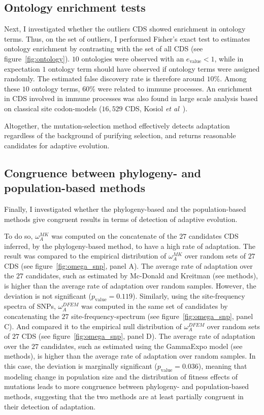 \documentclass{article}
\begin{document}
\subsection*{Ontology enrichment tests}
Next, I investigated whether the outliers CDS showed enrichment in ontology terms.
Thus, on the set of outliers, I performed Fisher's exact test to estimates ontology enrichment by contrasting with the set of all CDS (see figure~\ref{fig:ontology}).
$10$ ontologies were observed with an $e_{\mathrm{value}} <1$, while in expectation $1$ ontology term should have observed if ontology terms were assigned randomly.
The estimated false discovery rate is therefore around $10 \%$.
Among these $10$ ontology terms, $60 \%$ were related to immune processes.
An enrichment in CDS involved in immune processes was also found in large scale analysis based on classical site codon-models ($16,529$ CDS, Kosiol \textit{et al}~\citep{Kosiol2008}).


Altogether, the mutation-selection method effectively detects adaptation regardless of the background of purifying selection, and returns reasonable candidates for adaptive evolution.


\subsection*{Congruence between phylogeny- and population-based methods}
Finally, I investigated whether the phylogeny-based and the population-based methods give congruent results in terms of detection of adaptive evolution.

To do so, $\omega_A^{MK}$ was computed on the concatenate of the $27$ candidates CDS inferred, by the phylogeny-based method, to have a high rate of adaptation.
The result was compared to the empirical distribution of $\omega_A^{MK}$ over random sets of $27$ CDS (see figure~\ref{fig:omega_snp}, panel A).
The average rate of adaptation over the $27$ candidates, such as estimated by Mc-Donald and Kreitman (see methods), is higher than the average rate of adaptation over random samples.
However, the deviation is not significant ($p_{\mathrm{value}}=0.119$).
Similarly, using the site-frequency spectra of SNPs, $\omega_A^{DFEM}$ was computed in the same set of candidates by concatenating the $27$ site-frequency-spectrum (see figure~\ref{fig:omega_snp}, panel C).
And compared it to the empirical null distribution of $\omega_A^{DFEM}$ over random sets of $27$ CDS (see figure~\ref{fig:omega_snp}, panel D).
The average rate of adaptation over the $27$ candidates, such as estimated using the GammaExpo model (see methods), is higher than the average rate of adaptation over random samples.
In this case, the deviation is marginally significant ($p_{\mathrm{value}}=0.036$), 
meaning that modeling change in population size and the distribution of fitness effects of mutations leads to more congruence between phylogeny- and population-based methods, suggesting that the two methods are at least partially congruent in their detection of adaptation.
\end{document}
